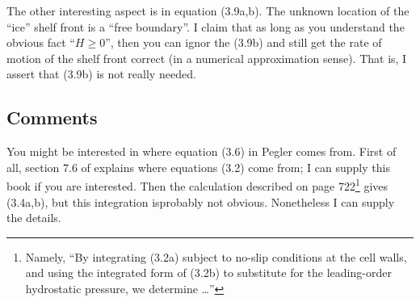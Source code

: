 \documentclass[11pt,final]{amsart}%
\begin{document}
The other interesting aspect is in equation (3.9a,b).  The unknown location of the ``ice'' shelf front is a ``free boundary''.  I claim that as long as you understand the obvious fact ``$H\ge 0$'', then you can ignor the (3.9b) and still get the rate of motion of the shelf front correct (in a numerical approximation sense).  That is, I assert that (3.9b) is not really needed.

\subsection*{Comments}  You might be interested in where equation (3.6) in Pegler comes from.  First of all, section 7.6 of \cite{Acheson} explains where equations (3.2) come from; I can supply this book if you are interested.  Then the calculation described on page 722\footnote{Namely, ``By integrating (3.2a) subject to no-slip conditions at the cell walls, and using the integrated form of (3.2b) to substitute for the leading-order hydrostatic pressure, we determine \dots''} gives (3.4a,b), but this integration isprobably not obvious.  Nonetheless I can supply the details.


\small
%

\end{document}
